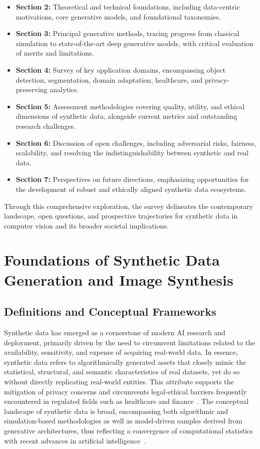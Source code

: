 \documentclass[sigconf]{acmart}
\begin{document}
\begin{itemize}
    \item \textbf{Section 2:} Theoretical and technical foundations, including data-centric motivations, core generative models, and foundational taxonomies.
    \item \textbf{Section 3:} Principal generative methods, tracing progress from classical simulation to state-of-the-art deep generative models, with critical evaluation of merits and limitations.
    \item \textbf{Section 4:} Survey of key application domains, encompassing object detection, segmentation, domain adaptation, healthcare, and privacy-preserving analytics.
    \item \textbf{Section 5:} Assessment methodologies covering quality, utility, and ethical dimensions of synthetic data, alongside current metrics and outstanding research challenges.
    \item \textbf{Section 6:} Discussion of open challenges, including adversarial risks, fairness, scalability, and resolving the indistinguishability between synthetic and real data.
    \item \textbf{Section 7:} Perspectives on future directions, emphasizing opportunities for the development of robust and ethically aligned synthetic data ecosystems.
\end{itemize}

Through this comprehensive exploration, the survey delineates the contemporary landscape, open questions, and prospective trajectories for synthetic data in computer vision and its broader societal implications.

\section{Foundations of Synthetic Data Generation and Image Synthesis}

\subsection{Definitions and Conceptual Frameworks}

Synthetic data has emerged as a cornerstone of modern AI research and deployment, primarily driven by the need to circumvent limitations related to the availability, sensitivity, and expense of acquiring real-world data. In essence, synthetic data refers to algorithmically generated assets that closely mimic the statistical, structural, and semantic characteristics of real datasets, yet do so without directly replicating real-world entities. This attribute supports the mitigation of privacy concerns and circumvents legal-ethical barriers frequently encountered in regulated fields such as healthcare and finance~\cite{ref87}. The conceptual landscape of synthetic data is broad, encompassing both algorithmic and simulation-based methodologies as well as model-driven samples derived from generative architectures, thus reflecting a convergence of computational statistics with recent advances in artificial intelligence~\cite{ref1,ref13,ref64,ref87}.
\end{document}
